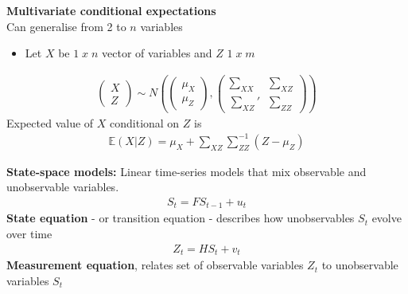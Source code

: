 \documentclass{beamer}
\begin{document}
\begin{frame}
  \textbf{Multivariate conditional expectations}\\
  Can generalise from 2 to $n$ variables
  \begin{itemize}
    \item Let $X$ be $1\; x\; n$ vector of variables and $Z$ $1\; x\; m$ 
  \end{itemize}  
  \begin{align}
    \begin{pmatrix}      X \\ Z    \end{pmatrix} \sim N \left( 
    \begin{pmatrix}      \mu_X \\ \mu_Z    \end{pmatrix},
    \begin{pmatrix}      \sum_{XX} & \sum_{XZ} \\ \sum_{XZ}' & \sum_{ZZ}    \end{pmatrix}
    \right)
  \end{align}
  \medskip 
  Expected value of $X$ conditional on $Z$ is 
  \begin{align}
    \mathbb{E}(X|Z) = \mu_X + \scriptstyle \sum_{XZ}\sum^{-1}_{ZZ} \textstyle(Z-\mu_Z)
  \end{align}  
\end{frame}

\begin{frame}
  \textbf{State-space models:} Linear time-series models that mix observable and unobservable variables.
  \begin{align}
    S_t=FS_{t-1} + u_t
  \end{align}
  \textbf{State equation} - or transition equation - describes how unobservables $S_t$ evolve over time
  \begin{align}
    Z_t= HS_t +v_t
  \end{align}
  \textbf{Measurement equation}, relates set of observable variables $Z_t$ to unobservable variables $S_t$    
\end{frame}
\end{document}
